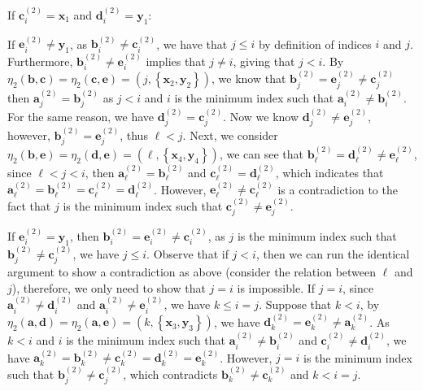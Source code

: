 \documentclass[11pt]{article}
\theoremstyle{definition}
\newcommand{\aaa}{\boldsymbol{a}}
\newcommand{\bb}{\boldsymbol{b}}
\newcommand{\cc}{\boldsymbol{c}}
\newcommand{\dd}{\boldsymbol{d}}
\newcommand{\ee}{\boldsymbol{e}}
\begin{document}
\begin{Case}
    \item If $\cc_{i}^{(2)}=\boldsymbol{x}_{1}$ and $\dd_{i}^{(2)}=\boldsymbol{y}_{1}$: 
    \begin{Case}
        \item If $\ee_{i}^{(2)}\neq \boldsymbol{y}_{1}$, as $\bb_{i}^{(2)}\neq \cc_{i}^{(2)}$, we have that $j\le i$ by definition of indices $i$ and $j$. Furthermore, $\bb_{i}^{(2)}\neq \ee_{i}^{(2)}$ implies that $j\neq i$, giving that $j<i$. By $\eta_{2}(\bb,\cc)=\eta_{2}(\cc,\ee)=(j,\left\{\boldsymbol{x}_{2},\boldsymbol{y}_{2}\right\})$, we know that $\bb_{j}^{(2)}=\ee_{j}^{(2)}\neq\cc_{j}^{(2)}$ then $\boldsymbol{a}_{j}^{(2)}=\bb_{j}^{(2)}$ as $j<i$ and $i$ is the minimum index such that $\boldsymbol{a}_{i}^{(2)}\neq\bb_{i}^{(2)}$. For the same reason, we have $\dd_{j}^{(2)}=\boldsymbol{c}_{j}^{(2)}$. Now we know $\dd_{j}^{(2)}\neq\ee_{j}^{(2)}$, however, $\bb_{j}^{(2)}=\ee_{j}^{(2)}$, thus $\ell<j$. Next, we consider $\eta_{2}(\bb,\ee)=\eta_{2}(\dd,\ee)=(\ell,\left\{\boldsymbol{x}_{4},\boldsymbol{y}_{4}\right\})$, we can see that $\bb_{\ell}^{(2)}=\dd_{\ell}^{(2)}\neq \ee_{\ell}^{(2)}$, since $\ell<j<i$, then $\aaa_{\ell}^{(2)}=\bb_{\ell}^{(2)}$ and $\boldsymbol{c}_{\ell}^{(2)}=\dd_{\ell}^{(2)}$, which indicates that $\aaa_{\ell}^{(2)}=\bb_{\ell}^{(2)}=\boldsymbol{c}_{\ell}^{(2)}=\dd_{\ell}^{(2)}$. However, $\ee_{\ell}^{(2)}\neq\cc_{\ell}^{(2)}$ is a contradiction to the fact that $j$ is the minimum index such that $\boldsymbol{c}_{j}^{(2)}\neq\ee_{j}^{(2)}$.

        
        \item If $\ee_{i}^{(2)}=\boldsymbol{y}_{1}$, then $\bb_{i}^{(2)}=\ee_{i}^{(2)}\neq\cc_{i}^{(2)}$, as $j$ is the minimum index such that $\bb_{j}^{(2)}\neq\cc_{j}^{(2)}$, we have $j\le i$. Observe that if $j<i$, then we can run the identical argument to show a contradiction as above (consider the relation between $\ell$ and $j$), therefore, we only need to show that $j=i$ is impossible. If $j=i$, since $\aaa_{i}^{(2)}\neq\dd_{i}^{(2)}$ and $\aaa_{i}^{(2)}\neq\ee_{i}^{(2)}$, we have $k\le i=j$. Suppose that $k<i$, by $\eta_{2}(\aaa,\dd)=\eta_{2}(\aaa,\ee)=(k,\left\{\boldsymbol{x}_{3},\boldsymbol{y}_{3}\right\})$, we have $\dd_{k}^{(2)}=\ee_{k}^{(2)}\neq \aaa_{k}^{(2)}$. As $k<i$ and $i$ is the minimum index such that $\aaa_{i}^{(2)}\neq \bb_{i}^{(2)}$ and $\cc_{i}^{(2)}\neq\dd_{i}^{(2)}$, we have $\aaa_{k}^{(2)}=\bb_{k}^{(2)}\neq \cc_{k}^{(2)}=\dd_{k}^{(2)}=\ee_{k}^{(2)}$. However, $j=i$ is the minimum index such that $\bb_{j}^{(2)}\neq\cc_{j}^{(2)}$, which contradicts $\bb_{k}^{(2)}\neq \cc_{k}^{(2)}$ and $k<i=j$.
        

\end{Case}
\end{Case}
\end{document}
